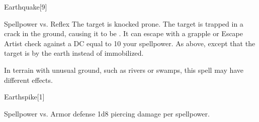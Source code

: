 \begin{spellsection}{Earthquake}[9]
    \begin{spellheader}
    \end{spellheader}
    \begin{spellcontent}
        \begin{spelltargetinginfo}
        \end{spelltargetinginfo}
        \begin{spelleffects}
            \begin{spellattack}{Spellpower vs. Reflex}
                \spelleffect The target is knocked prone.
                \spellsuccess The target is trapped in a crack in the ground, causing it to be \immobilized. It can escape with a grapple or Escape Artist check against a DC equal to 10 \add your spellpower.
                \spellcritical As above, except that the target is \grappled by the earth instead of immobilized.
            \end{spellattack}
        \end{spelleffects}
    \end{spellcontent}
    \begin{spellfooter}
        \spellnotes In terrain with unusual ground, such as rivers or swamps, this spell may have different effects.

        \physicalspellnotes
        \miscastyou
    \end{spellfooter}
\end{spellsection}

\begin{spellsection}{Earthspike}[1]
    \begin{spellheader}
    \end{spellheader}
    \begin{spellcontent}
        \begin{spelltargetinginfo}
            \spellrng{\rngmed}
        \end{spelltargetinginfo}
        \begin{spelleffects}
            \begin{spellattack}{Spellpower vs. Armor defense}
                \spellsuccess 1d8 piercing damage per spellpower.
            \end{spellattack}
        \end{spelleffects}
    \end{spellcontent}
    \begin{spellfooter}
        \miscastrandom
    \end{spellfooter}
\end{spellsection}


